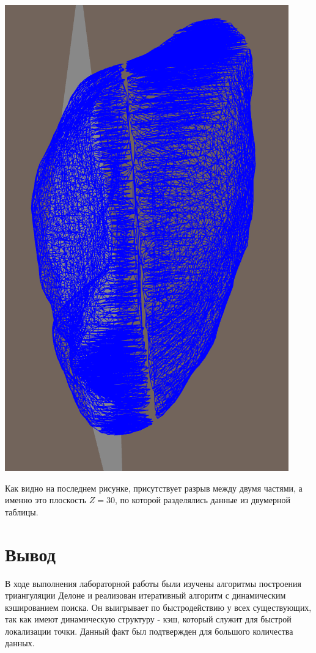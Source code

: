 \documentclass[a4paper, 12pt]{article}   	%
\begin{document}
    \begin{center}
        \begin{minipage}{0.7\linewidth}
            \includegraphics[width=\linewidth]{img/up+down_2}
        \end{minipage}
    \end{center}
    
    Как видно на последнем рисунке, присутствует разрыв между двумя частями, а именно это плоскость $Z = 30$, по которой разделялись данные из двумерной таблицы. 

\newpage
\section{Вывод}
    В ходе выполнения лабораторной работы были изучены алгоритмы построения триангуляции Делоне и реализован итеративный алгоритм с динамическим кэшированием поиска. Он выигрывает по быстродействию у всех существующих, так как имеют динамическую структуру - кэш, который служит для быстрой локализации точки. Данный факт был подтвержден для большого количества данных.
    
\end{document}
